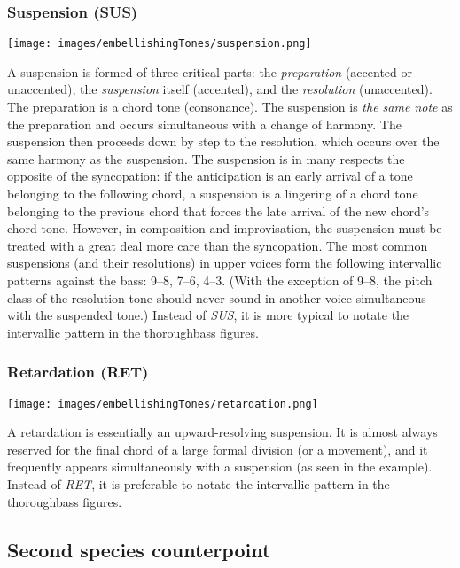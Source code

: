 \documentclass{book}
\begin{document}
\hypertarget{suspension-sus-1}{%
\subsubsection{Suspension (SUS)}\label{suspension-sus-1}}

\texttt{[image: images/embellishingTones/suspension.png]}

A suspension is formed of three critical parts: the \emph{preparation}
(accented or unaccented), the \emph{suspension} itself (accented), and the
\emph{resolution} (unaccented). The preparation is a chord tone (consonance).
The suspension is \emph{the same note} as the preparation and occurs
simultaneous with a change of harmony. The suspension then proceeds down by
step to the resolution, which occurs over the same harmony as the suspension.
The suspension is in many respects the opposite of the syncopation: if the
anticipation is an early arrival of a tone belonging to the following chord, a
suspension is a lingering of a chord tone belonging to the previous chord that
forces the late arrival of the new chord's chord tone. However, in composition
and improvisation, the suspension must be treated with a great deal more care
than the syncopation. The most common suspensions (and their resolutions) in
upper voices form the following intervallic patterns against the bass: 9--8,
7--6, 4--3. (With the exception of 9--8, the pitch class of the resolution
tone should never sound in another voice simultaneous with the suspended
tone.) Instead of \emph{SUS}, it is more typical to notate the intervallic
pattern in the thoroughbass figures.

\hypertarget{retardation-ret}{%
\subsubsection{Retardation (RET)}\label{retardation-ret}}

\texttt{[image: images/embellishingTones/retardation.png]}

A retardation is essentially an upward-resolving suspension. It is almost
always reserved for the final chord of a large formal division (or a
movement), and it frequently appears simultaneously with a suspension (as seen
in the example). Instead of \emph{RET}, it is preferable to notate the
intervallic pattern in the thoroughbass figures.

\hypertarget{second-species-counterpoint-1}{%
\subsection{Second species counterpoint}\label{second-species-counterpoint-1}}
\end{document}

